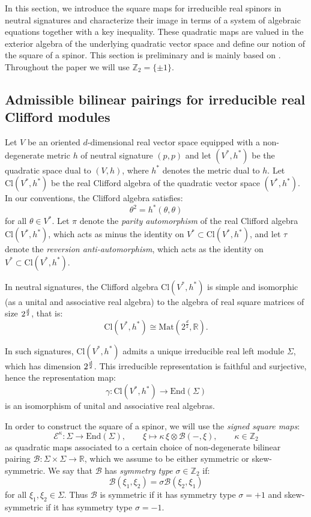 \documentclass[10pt,reqno]{amsart}
\theoremstyle{definition}
\theoremstyle{remark}
\newcommand{\Z}{\mathbb{Z}}
\newcommand{\R}{\mathbb{R}}
\newcommand{\Mat}{\mathrm{Mat}}
\newcommand{\End}{\mathrm{End}}
\begin{document}
In this section, we introduce the square maps for irreducible real spinors in neutral signatures and characterize their image in terms of a system of algebraic equations together with a key inequality. These quadratic maps are valued in the exterior algebra of the underlying quadratic vector space and define our notion of the square of a spinor. This section is preliminary and is mainly based on \cite{Cortes_Lazaroiu_Shahbazi2021}. Throughout the paper we will use $\Z_2=\{\pm1\}$.

\subsection{Admissible bilinear pairings for irreducible real Clifford modules}

Let $V$ be an oriented $d$-dimensional real vector space equipped with a non-degenerate metric $h$ of neutral signature $(p,p)$ and let $(V^*,h^*)$ be the quadratic space dual to $(V,h)$, where $h^*$ denotes the metric dual to $h$. Let $\mathrm{Cl}(V^*,h^*)$ be the real Clifford algebra of the quadratic vector space $(V^*,h^*)$. In our conventions, the Clifford algebra satisfies: $$\theta^2=h^*(\theta,\theta)$$ for all $\theta\in V^*$. Let $\pi$ denote the \emph{parity automorphism} of the real Clifford algebra $\mathrm{Cl}(V^*,h^*)$, which acts as minus the identity on $V^*\subset\mathrm{Cl}(V^*,h^*)$, and let $\tau$ denote the \emph{reversion anti-automorphism}, which acts as the identity on $V^*\subset\mathrm{Cl}(V^*,h^*)$.\medskip

In neutral signatures, the Clifford algebra $\mathrm{Cl}(V^*,h^*)$ is simple and isomorphic (as a unital and associative real algebra) to the algebra of real square matrices of size $2^{\smash{\frac{d}{2}}}$, that is: $$\mathrm{Cl}(V^*,h^*)\cong\Mat(2^{\frac{d}{2}},\R).$$

In such signatures, $\mathrm{Cl}(V^*,h^*)$ admits a unique irreducible real left module $\Sigma$, which has dimension $2^{\smash{\frac{d}{2}}}$. This irreducible representation is faithful and surjective, hence the representation map: $$\gamma\colon\mathrm{Cl}(V^*,h^*)\to\End(\Sigma)$$ is an isomorphism of unital and associative real algebras.\medskip

In order to construct the square of a spinor, we will use the \emph{signed square maps}: $$\mathcal{E}^\kappa\colon\Sigma\to\End(\Sigma),\qquad\xi\mapsto\kappa\,\xi\otimes\mathscr{B}(-,\xi),\qquad\kappa\in\Z_2$$ as quadratic maps associated to a certain choice of non-degenerate bilinear pairing $\mathscr{B}\colon\Sigma\times\Sigma\to\R$, which we assume to be either symmetric or skew-symmetric. We say that $\mathscr{B}$ has \emph{symmetry type} $\sigma\in\Z_2$ if: $$\mathscr{B}(\xi_1,\xi_2)=\sigma\mathscr{B}(\xi_2,\xi_1)$$ for all $\xi_1,\xi_2\in\Sigma$. Thus $\mathscr{B}$ is symmetric if it has symmetry type $\sigma=+1$ and skew-symmetric if it has symmetry type $\sigma=-1$.\medskip
\end{document}
